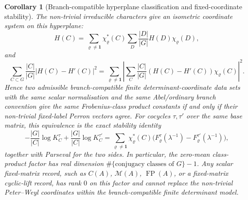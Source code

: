 \documentclass[11pt,a4paper]{amsart}
\theoremstyle{plain}
\newtheorem{corollary}[theorem]{Corollary}
\theoremstyle{definition}
\theoremstyle{remark}
\DeclareMathOperator{\FP}{FP}
\begin{document}
\begin{corollary}[Branch-compatible hyperplane classification and fixed-coordinate stability]
  The non-trivial irreducible characters give an isometric coordinate system
  on this hyperplane:
  \begin{equation}\label{eq:class-product-hyperplane-expansion}
    H(C)=
    \sum_{\varrho\ne\mathbf1}
      \chi_\varrho^\ast(C)
      \sum_D\frac{|D|}{|G|}H(D)\chi_\varrho(D),
  \end{equation}
  and
  \begin{equation}\label{eq:class-product-stability-isometry}
    \sum_{C\subset G}\frac{|C|}{|G|}|H(C)-H'(C)|^2
    =
    \sum_{\varrho\ne\mathbf1}
      \left|
        \sum_C\frac{|C|}{|G|}(H(C)-H'(C))\chi_\varrho(C)
      \right|^2 .
  \end{equation}
  Hence two admissible branch-compatible finite determinant-coordinate data
  sets with the same scalar normalisation and the same Abel/ordinary branch
  convention give the same Frobenius-class product constants if and only if
  their non-trivial fixed-label Perron vectors agree.
  For cocycles \(\tau,\tau'\) over the same base matrix, this equivalence is
  the exact stability identity
  \begin{equation}\label{eq:class-product-stability-forward}
    -\frac{|G|}{|C|}\log K_C^\tau
    +\frac{|G|}{|C|}\log K_C^{\tau'}
    =
    \sum_{\varrho\neq\mathbf1}
      \chi_\varrho^\ast(C)
      \bigl(F_\varrho^\tau(\lambda^{-1})
            -F_\varrho^{\tau'}(\lambda^{-1})\bigr),
  \end{equation}
  together with Parseval for the two sides.  In particular, the zero-mean
  class-product factor has real dimension
  \(\#\{\text{conjugacy classes of }G\}-1\).  Any scalar fixed-matrix
  record, such as \(C(A)\), \(\mathcal M(A)\), \(\FP(A)\), or a fixed-matrix
  cyclic-lift record, has rank \(0\) on this factor and cannot replace the
  non-trivial Peter--Weyl coordinates within the branch-compatible finite
  determinant model.
\end{corollary}
\end{document}
